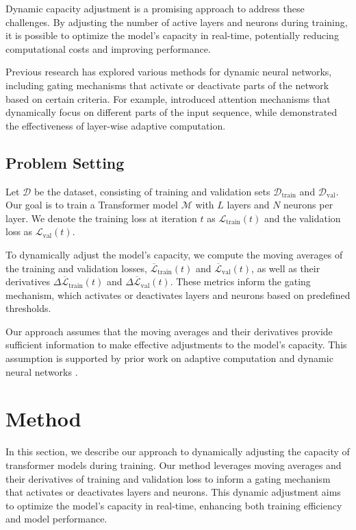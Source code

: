 \documentclass{article} %
\begin{document}
Dynamic capacity adjustment is a promising approach to address these challenges. By adjusting the number of active layers and neurons during training, it is possible to optimize the model's capacity in real-time, potentially reducing computational costs and improving performance.

Previous research has explored various methods for dynamic neural networks, including gating mechanisms that activate or deactivate parts of the network based on certain criteria. For example, \citet{bahdanau2014neural} introduced attention mechanisms that dynamically focus on different parts of the input sequence, while \citet{radford2019language} demonstrated the effectiveness of layer-wise adaptive computation.

\subsection{Problem Setting}
\label{sec:problem_setting}

Let $\mathcal{D}$ be the dataset, consisting of training and validation sets $\mathcal{D}_{\text{train}}$ and $\mathcal{D}_{\text{val}}$. Our goal is to train a Transformer model $\mathcal{M}$ with $L$ layers and $N$ neurons per layer. We denote the training loss at iteration $t$ as $\mathcal{L}_{\text{train}}(t)$ and the validation loss as $\mathcal{L}_{\text{val}}(t)$.

To dynamically adjust the model's capacity, we compute the moving averages of the training and validation losses, $\overline{\mathcal{L}}_{\text{train}}(t)$ and $\overline{\mathcal{L}}_{\text{val}}(t)$, as well as their derivatives $\Delta \overline{\mathcal{L}}_{\text{train}}(t)$ and $\Delta \overline{\mathcal{L}}_{\text{val}}(t)$. These metrics inform the gating mechanism, which activates or deactivates layers and neurons based on predefined thresholds.

Our approach assumes that the moving averages and their derivatives provide sufficient information to make effective adjustments to the model's capacity. This assumption is supported by prior work on adaptive computation and dynamic neural networks \citep{bahdanau2014neural, radford2019language}.

\section{Method}
\label{sec:method}

In this section, we describe our approach to dynamically adjusting the capacity of transformer models during training. Our method leverages moving averages and their derivatives of training and validation loss to inform a gating mechanism that activates or deactivates layers and neurons. This dynamic adjustment aims to optimize the model's capacity in real-time, enhancing both training efficiency and model performance.
\end{document}
